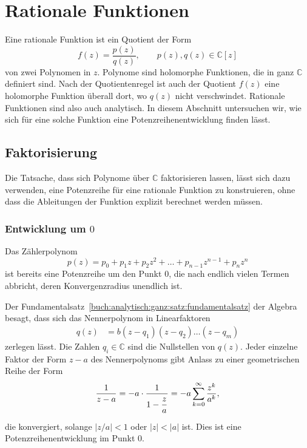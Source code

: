 %
%
%
\section{Rationale Funktionen
\label{buch:analytisch:section:rational}}
Eine rationale Funktion ist ein Quotient der Form
\[
f(z)
=
\frac{p(z)}{q(z)},
\qquad
p(z),q(z)\in\mathbb{C}[z]
\]
von zwei Polynomen in $z$.
Polynome sind holomorphe Funktionen, die in ganz $\mathbb{C}$
definiert sind.
Nach der Quotientenregel ist auch der Quotient $f(z)$ eine holomorphe
Funktion überall dort, wo $q(z)$ nicht verschwindet.
Rationale Funktionen sind also auch analytisch.
In diesem Abschnitt untersuchen wir, wie sich für eine solche Funktion
eine Potenzreihenentwicklung finden lässt.

%
%
\subsection{Faktorisierung
\label{buch:analytisch:rational:subsection:faktorisierung}}
Die Tatsache, dass sich Polynome über $\mathbb{C}$ faktorisieren
lassen, lässt sich dazu verwenden, eine Potenzreihe für eine
rationale Funktion zu konstruieren, ohne dass die Ableitungen
der Funktion explizit berechnet werden müssen.

%
%
\subsubsection{Entwicklung um $0$}
Das Zählerpolynom
\[
p(z)
=
p_0
+
p_1z
+
p_2z^2
+ \dots +
p_{n-1}z^{n-1}
+
p_nz^n
\]
ist bereits eine Potenzreihe um den Punkt $0$, die nach endlich
vielen Termen abbricht, deren Konvergenzradius unendlich ist.

Der Fundamentalsatz~\ref{buch:analytisch:ganz:satz:fundamentalsatz}
der Algebra besagt, dass sich das
Nennerpolynom in Linearfaktoren 
\begin{align*}
q(z) &= b(z - q_1)(z - q_2)\dots(z - q_m)
\end{align*}
zerlegen lässt. 
Die Zahlen $q_i\in\mathbb{C}$ sind die Nullstellen von $q(z)$.
Jeder einzelne Faktor der Form $z-a$ des Nennerpolynoms gibt
Anlass zu einer geometrischen Reihe der Form
\[
\frac{1}{z-a}
=
-a\cdot \frac{1}{\displaystyle 1-\frac{z\mathstrut}{a\mathstrut}}
=
-a
\sum_{k=0}^\infty
\frac{z^k}{a^k},
\]
die konvergiert, solange $|z/a|<1$ oder $|z| < |a|$ ist.
Dies ist eine Potenzreihenentwicklung im Punkt $0$.

